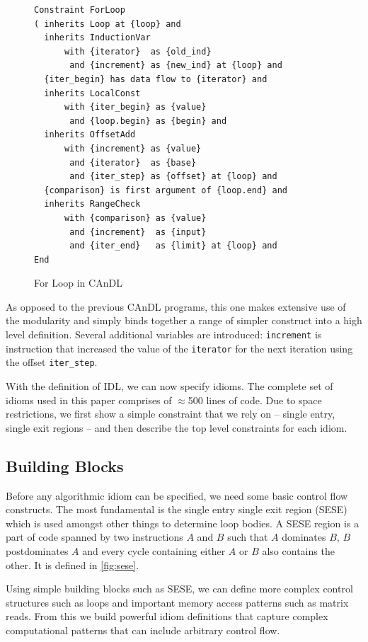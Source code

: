\begin{figure}[h]
\begin{lstlisting}[language=CAnDL]
Constraint ForLoop
( inherits Loop at {loop} and
  inherits InductionVar
      with {iterator}  as {old_ind}
       and {increment} as {new_ind} at {loop} and
  {iter_begin} has data flow to {iterator} and
  inherits LocalConst
      with {iter_begin} as {value}
       and {loop.begin} as {begin} and
  inherits OffsetAdd
      with {increment} as {value}
       and {iterator}  as {base}
       and {iter_step} as {offset} at {loop} and
  {comparison} is first argument of {loop.end} and
  inherits RangeCheck
      with {comparison} as {value}
       and {increment}  as {input}
       and {iter_end}   as {limit} at {loop} and
End
\end{lstlisting}
\caption{For Loop in CAnDL}
\label{candl_forloop}
\end{figure}

    As opposed to the previous CAnDL programs, this one makes extensive use of
    the modularity and simply binds together a range of simpler construct into
    a high level definition.
    Several additional variables are introduced: {\tt increment} is instruction
    that increased the value of the {\tt iterator} for the next iteration using
    the offset {\tt iter\_step}.

    With the definition of IDL, we can now specify idioms.
    The complete set of idioms used in this paper comprises of $\approx$500
    lines of code.
    Due to space restrictions, we first show a simple constraint that we rely
    on -- single entry, single exit regions -- and then describe the top level
    constraints for each idiom.

\subsection{Building Blocks}

    Before any algorithmic idiom can be specified, we need some basic control
    flow constructs.
    The most fundamental is the single entry single exit region (SESE)
    \cite{johnson1994program} which is used amongst other things to determine
    loop bodies.
    A SESE region is a part of code spanned by two instructions $A$ and $B$ such
    that $A$ dominates $B$, $B$ postdominates $A$ and every cycle containing
    either $A$ or $B$ also contains the other.
    It is defined in \autoref{fig:sese}.

    Using simple building blocks such as SESE, we can define more complex
    control structures such as loops and important memory access patterns such
    as matrix reads.
    From this we build powerful idiom definitions that capture complex
    computational patterns that can include arbitrary control flow.


